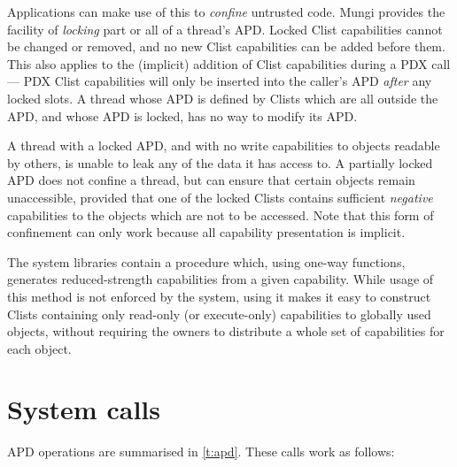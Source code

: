 \documentclass[a4paper,11pt,twoside,dvips]{report}
\begin{document}
Applications can make use of this to \emph{confine} untrusted
code. Mungi provides the facility of \emph{locking} part or all of a
thread's APD. Locked Clist capabilities cannot be changed or removed,
and no new Clist capabilities can be added before them. This also
applies to the (implicit) addition of Clist capabilities during a PDX
call --- PDX Clist capabilities will only be inserted into the caller's
APD \emph{after} any locked slots. A thread whose APD is defined by
Clists which are all outside the APD, and whose APD is locked, has no
way to modify its APD.

A thread with a locked APD, and with no write capabilities to objects
readable by others, is unable to leak any of the data it has access
to. A partially locked APD does not confine a thread, but can ensure
that certain objects remain unaccessible, provided that one of the
locked Clists contains sufficient \emph{negative} capabilities to the
objects which are not to be accessed\cite{Vochteloo:phd}. Note that this
form of confinement can only work because all capability presentation
is implicit.

\begin{sloppypar}
The system libraries contain a procedure which, using one-way functions,
generates reduced-strength capabilities from a given capability. While
usage of this method is not enforced by the system, using it makes it
easy to construct Clists containing only read-only (or execute-only)
capabilities to globally used objects, without requiring the owners to
distribute a whole set of capabilities for each object.
\end{sloppypar}


\section{\label{s:apd-call}System calls}


APD operations are summarised in \autoref{t:apd}. These calls work as
follows:
\end{document}
